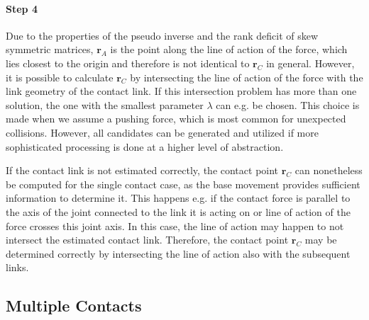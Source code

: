 \paragraph{Step 4}
\label{sec:isolation_step4}
Due to the properties of the pseudo inverse and the rank deficit of skew symmetric matrices, $\bm{r}_{A}$ is the point along the line of action of the force, which lies closest to the origin and therefore is not identical to $\bm{r}_C$ in general.
However, it is possible to calculate $\bm{r}_C$ by intersecting the line of action of the force with the link geometry of the contact link.
If this intersection problem has more than one solution, the one with the smallest parameter $\lambda$ can e.g. be chosen.
This choice is made when we assume a pushing force, which is most common for unexpected collisions.
However, all candidates can be generated and utilized if more sophisticated processing is done at a higher level of abstraction.

If the contact link is not estimated correctly, the contact point $\bm{r}_C$ can nonetheless be computed for the single contact case, as the base movement provides sufficient information to determine it.
This happens e.g. if the contact force is parallel to the axis of the joint connected to the link it is acting on or line of action of the force crosses this joint axis.
In this case, the line of action may happen to not intersect the estimated contact link.
Therefore, the contact point $\bm{r}_C$ may be determined correctly by intersecting the line of action also with the subsequent links.

\subsection{Multiple Contacts}

